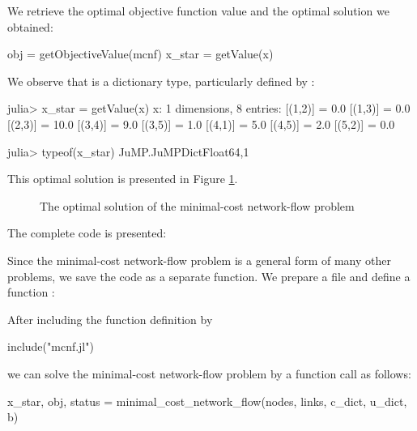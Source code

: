 We retrieve the optimal objective function value and the optimal solution we obtained:
\begin{code}
obj = getObjectiveValue(mcnf)
x_star = getValue(x)
\end{code}
\noindent We observe that  is a dictionary type, particularly defined by \jump{}:
\begin{code}
julia> x_star = getValue(x)
x: 1 dimensions, 8 entries:
 [(1,2)] = 0.0
 [(1,3)] = 0.0
 [(2,3)] = 10.0
 [(3,4)] = 9.0
 [(3,5)] = 1.0
 [(4,1)] = 5.0
 [(4,5)] = 2.0
 [(5,2)] = 0.0

julia> typeof(x_star)
JuMP.JuMPDict{Float64,1}
\end{code}

This optimal solution is presented in Figure \ref{fig:solution_mcnf}.


\begin{figure}
\caption{The optimal solution of the minimal-cost network-flow problem\label{fig:solution_mcnf}}
\end{figure}



The complete code is presented:
\begin{codelisting}
\end{codelisting}

Since the minimal-cost network-flow problem is a general form of many other problems, we save the code as a separate function. We prepare a  file and define a function :
\begin{codelisting}
\end{codelisting}

After including the function definition by
\begin{code}
include("mcnf.jl")
\end{code}
\noindent we can solve the minimal-cost network-flow problem by a function call as follows:
\begin{code}
x_star, obj, status =
	minimal_cost_network_flow(nodes, links, c_dict, u_dict, b)
\end{code}



















